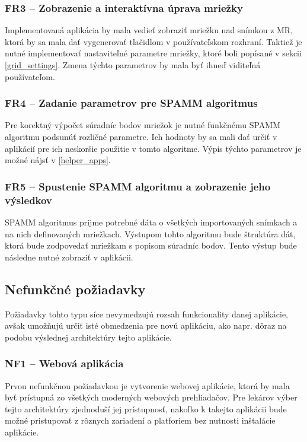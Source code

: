\subsubsection {FR3 -- Zobrazenie a interaktívna úprava mriežky}\label{fr3}
Implementovaná aplikácia by mala vedieť zobraziť mriežku nad snímkou z MR, ktorá by sa mala dať vygenerovať tlačidlom v používateľskom rozhraní. Taktiež je nutné implementovať nastaviteľné parametre mriežky, ktoré boli popísané v sekcii \ref{grid_settings}. Zmena týchto parametrov by mala byť ihneď viditeľná používateľom.

\subsubsection {FR4 -- Zadanie parametrov pre SPAMM algoritmus}\label{fr4}
Pre korektný výpočet súradníc bodov mriežok je nutné funkčnému SPAMM algoritmu podsunúť rozličné parametre. Ich hodnoty by sa mali dať určiť v aplikácií pre ich neskoršie použitie v tomto algoritme. Výpis týchto parametrov je možné nájsť v \ref{helper_apps}.

\subsubsection {FR5 -- Spustenie SPAMM algoritmu a zobrazenie jeho výsledkov}\label{fr5}
SPAMM algoritmus prijme potrebné dáta o všetkých importovaných snímkach a na nich definovaných mriežkach. Výstupom tohto algoritmu bude štruktúra dát, ktorá bude zodpovedať mriežkam s popisom súradníc bodov. Tento výstup bude následne nutné zobraziť v aplikácii.

\subsection {Nefunkčné požiadavky}
Požiadavky tohto typu síce nevymedzujú rozsah funkcionality danej aplikácie, avšak umožňujú určiť isté obmedzenia pre novú aplikáciu, ako napr. dôraz na podobu výslednej architektúry tejto aplikácie.

\subsubsection {NF1 -- Webová aplikácia}
Prvou nefunkčnou požiadavkou je vytvorenie webovej aplikácie, ktorá by mala byť prístupná zo všetkých moderných webových prehliadačov. Pre lekárov výber tejto architektúry zjednoduší jej prístupnosť, nakoľko k takejto aplikácii bude možné pristupovať z rôznych zariadení a platforiem bez nutnosti inštalácie aplikácie.

